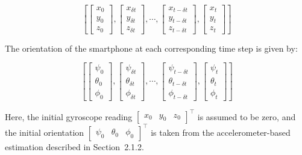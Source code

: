 \documentclass{article}
\begin{document}
    \[
        \left[
        \begin{bmatrix}
            x_{0} \\
            y_{0} \\
            z_{0}
        \end{bmatrix},
        \begin{bmatrix}
            x_{\delta t} \\
            y_{\delta t} \\
            z_{\delta t}
        \end{bmatrix}, \cdots,
        \begin{bmatrix}
            x_{t-\delta t} \\
            y_{t-\delta t} \\
            z_{t-\delta t}
        \end{bmatrix},
        \begin{bmatrix}
            x_{t} \\
            y_{t} \\
            z_{t}
        \end{bmatrix}
        \right]
    \]

    The orientation of the smartphone at each corresponding time step is given
    by:

    \[
        \left[
        \begin{bmatrix}
            \psi_{0}   \\
            \theta_{0} \\
            \phi_{0}
        \end{bmatrix},
        \begin{bmatrix}
            \psi_{\delta t}   \\
            \theta_{\delta t} \\
            \phi_{\delta t}
        \end{bmatrix}, \cdots,
        \begin{bmatrix}
            \psi_{t-\delta t}   \\
            \theta_{t-\delta t} \\
            \phi_{t-\delta t}
        \end{bmatrix},
        \begin{bmatrix}
            \psi_{t}   \\
            \theta_{t} \\
            \phi_{t}
        \end{bmatrix}
        \right]
    \]

    Here, the initial gyroscope reading $\begin{bmatrix}
        x_{0} & y_{0} & z_{0}
    \end{bmatrix}^{\top}$ is assumed to be zero, and the initial orientation $\begin{bmatrix}
        \psi_{0} & \theta_{0} & \phi_{0}
    \end{bmatrix}^{\top}$ is taken from the accelerometer-based estimation described
    in Section~2.1.2.
\end{document}

